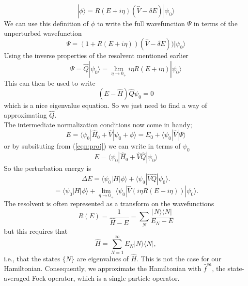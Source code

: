 \documentclass[12pt]{article}
\begin{document}
\begin{equation}
 |\phi \rangle = R(E + i\eta) (\hat{V}-\delta E)|\psi_{0} \rangle
\end{equation}
We can use this definition of $\phi$ to write the full wavefunction $\Psi$ in
terms of the unperturbed wavefunction
\begin{equation}
\Psi =  (1+ R(E + i\eta) )(\hat{V}-\delta E))|\psi_{0} \rangle
\end{equation}
Using the inverse properties of the resolvent mentioned earlier
\begin{equation}
\Psi = \hat{Q}|\psi_{0}\rangle = \lim_{\eta \rightarrow 0_{+}}i\eta R(E+i\eta)|\psi_{0}\rangle
\end{equation}
This can then be used to write
\begin{equation}
(E-\hat{H}) \hat{Q}\psi_{0}  = 0 
\label{eqn:proj} 
\end{equation}
which is a nice eigenvalue equation. So we just need to find a way of approximating $\hat{Q}$.\\

\noindent  The intermediate normalization conditions now come in handy; 
\begin{equation}
E = \langle \psi_{0} | \hat{H}_{0} + \hat{V}  |  \psi_{0} + \phi \rangle  = E_{0} + \langle \psi_{0} | \hat{V} | \Psi \rangle 
\end{equation}
or by subsituting from (\ref{eqn:proj}) we can write in terms of $\psi_{0}$ 
\begin{equation}
E = \langle \psi_{0} | \hat{H}_{0} + \hat{V}\hat{Q}|  \psi_{0} \rangle 
\end{equation}
So the perturbation energy is 
\begin{equation*}
\Delta E = \langle \psi_{0} | H | \phi \rangle + \langle \psi_{0} | \hat{V}\hat{Q}|  \psi_{0} \rangle . 
\end{equation*}
\begin{equation}
= \langle \psi_{0} | H | \phi \rangle +\lim_{\eta \rightarrow 0_{+}} \langle \psi_{0} | \hat{V} (i\eta R(E+i\eta))  |\psi_{0} \rangle . 
\end{equation}
The resolvent is often represented as a transform on the wavefunctions 
\begin{equation}
R(E) = \frac{1}{\hat{H}-E} = \sum_{N} \frac{|N\rangle \langle N| }{ E_{N}-E }
\end{equation}
but this requires that 
\begin{equation}
\hat{H} = \sum_{N=1}^{\infty} E_{N} | N \rangle \langle N | ,
\end{equation}
i.e., that the states $\{ N \}$ are eigenvalues of $\hat{H}$. This is not the case for our Hamiltonian. Consequently, 
we approximate the Hamiltonian with $\hat{f}^{sa}$,  the state-averaged Fock operator, which is a single particle operator.
\end{document}
